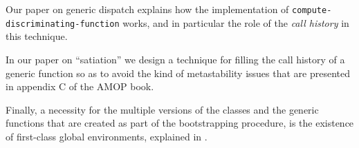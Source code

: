 Our paper on generic dispatch \cite{Strandh:2014:FGD:2635648.2635654}
explains how the \sicl{} implementation of
\texttt{compute-discriminating-function} works, and in particular the
role of the \emph{call history} in this technique.

In our paper on ``satiation'' \cite{Strandh:2014:RMI:2635648.2635656}
we design a technique for filling the call history of a generic
function so as to avoid the kind of metastability issues that are
presented in appendix C of the AMOP book.

Finally, a necessity for the multiple versions of the classes and the
generic functions that are created as part of the \sicl{}
bootstrapping procedure, is the existence of first-class global
environments, explained in \cite{Strandh:2015:ELS:Environments}.
